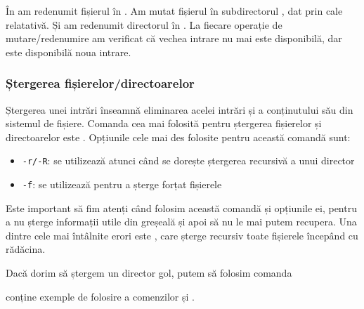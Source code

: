 În  am redenumit fișierul  în .
Am mutat fișierul  în subdirectorul , dat prin cale relatativă.
Și am redenumit directorul  în .
La fiecare operație de mutare/redenumire am verificat că vechea intrare nu mai este disponibilă, dar este disponibilă noua intrare.

\subsubsection{Ștergerea fișierelor/directoarelor}
\label{sec:fs:rm}

Ștergerea unei intrări înseamnă eliminarea acelei intrări și a conținutului său din sistemul de fișiere.
Comanda cea mai folosită pentru ștergerea fișierelor și directoarelor este
.
Opțiunile cele mai des folosite pentru această comandă sunt:

\begin{itemize}
  \item \texttt{-r/-R}: se utilizează atunci când se dorește ștergerea recursivă a unui director
  \item \texttt{-f}: se utilizează pentru a șterge forțat fișierele
\end{itemize}

Este important să fim atenți când folosim această comandă și opțiunile ei, pentru a nu șterge informații utile din greșeală și apoi să nu le mai putem recupera.
Una dintre cele mai întâlnite erori este , care șterge recursiv toate fișierele începând cu rădăcina.

\begin{note}[Observație]
Dacă dorim să ștergem un director gol, putem să folosim comanda
\end{note}

 conține exemple de folosire a comenzilor  și .


